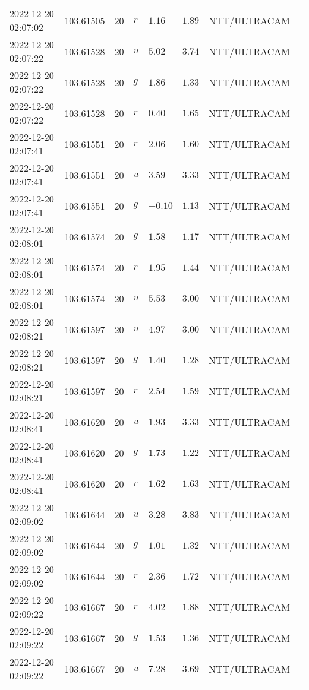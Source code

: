 \documentclass{nature_plusfigure}
\begin{document}
\begin{supplement}
\begin{center}
\begin{longtable}{llllllll}
2022-12-20 02:07:02 & 103.61505 & 20 & $r$ & $1.16$ & $1.89$ & NTT/ULTRACAM &  \\ 
2022-12-20 02:07:22 & 103.61528 & 20 & $u$ & $5.02$ & $3.74$ & NTT/ULTRACAM &  \\ 
2022-12-20 02:07:22 & 103.61528 & 20 & $g$ & $1.86$ & $1.33$ & NTT/ULTRACAM &  \\ 
2022-12-20 02:07:22 & 103.61528 & 20 & $r$ & $0.40$ & $1.65$ & NTT/ULTRACAM &  \\ 
2022-12-20 02:07:41 & 103.61551 & 20 & $r$ & $2.06$ & $1.60$ & NTT/ULTRACAM &  \\ 
2022-12-20 02:07:41 & 103.61551 & 20 & $u$ & $3.59$ & $3.33$ & NTT/ULTRACAM &  \\ 
2022-12-20 02:07:41 & 103.61551 & 20 & $g$ & $-0.10$ & $1.13$ & NTT/ULTRACAM &  \\ 
2022-12-20 02:08:01 & 103.61574 & 20 & $g$ & $1.58$ & $1.17$ & NTT/ULTRACAM &  \\ 
2022-12-20 02:08:01 & 103.61574 & 20 & $r$ & $1.95$ & $1.44$ & NTT/ULTRACAM &  \\ 
2022-12-20 02:08:01 & 103.61574 & 20 & $u$ & $5.53$ & $3.00$ & NTT/ULTRACAM &  \\ 
2022-12-20 02:08:21 & 103.61597 & 20 & $u$ & $4.97$ & $3.00$ & NTT/ULTRACAM &  \\ 
2022-12-20 02:08:21 & 103.61597 & 20 & $g$ & $1.40$ & $1.28$ & NTT/ULTRACAM &  \\ 
2022-12-20 02:08:21 & 103.61597 & 20 & $r$ & $2.54$ & $1.59$ & NTT/ULTRACAM &  \\ 
2022-12-20 02:08:41 & 103.61620 & 20 & $u$ & $1.93$ & $3.33$ & NTT/ULTRACAM &  \\ 
2022-12-20 02:08:41 & 103.61620 & 20 & $g$ & $1.73$ & $1.22$ & NTT/ULTRACAM &  \\ 
2022-12-20 02:08:41 & 103.61620 & 20 & $r$ & $1.62$ & $1.63$ & NTT/ULTRACAM &  \\ 
2022-12-20 02:09:02 & 103.61644 & 20 & $u$ & $3.28$ & $3.83$ & NTT/ULTRACAM &  \\ 
2022-12-20 02:09:02 & 103.61644 & 20 & $g$ & $1.01$ & $1.32$ & NTT/ULTRACAM &  \\ 
2022-12-20 02:09:02 & 103.61644 & 20 & $r$ & $2.36$ & $1.72$ & NTT/ULTRACAM &  \\ 
2022-12-20 02:09:22 & 103.61667 & 20 & $r$ & $4.02$ & $1.88$ & NTT/ULTRACAM &  \\ 
2022-12-20 02:09:22 & 103.61667 & 20 & $g$ & $1.53$ & $1.36$ & NTT/ULTRACAM &  \\ 
2022-12-20 02:09:22 & 103.61667 & 20 & $u$ & $7.28$ & $3.69$ & NTT/ULTRACAM &  \\ 

\end{longtable}
\end{center}
\end{supplement}
\end{document}
